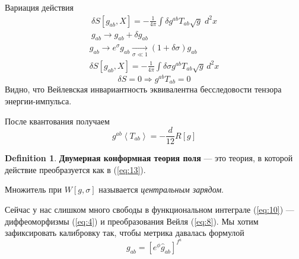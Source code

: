 \documentclass[a4paper,12pt]{article}
\theoremstyle{definition} \newtheorem{Def}{Definition}
\begin{document}
Вариация действия
\begin{equation}
  \label{eq:14}
  \begin{split}
    \delta S[g_{ab},X] = -\frac{1}{4\pi} \int \delta g^{ab} T_{ab} \sqrt{g} \; d^2x\\
    g_{ab}\to g_{ab}+\delta g_{ab}
  \end{split}
\end{equation}
\begin{equation}
  \label{eq:15}
  \begin{split}
    g_{ab} \to e^{\sigma} g_{ab} \xrightarrow[\sigma \ll 1]{} (1+\delta\sigma) g_{ab}\\
    \delta S [g_{ab},X] = -\frac{1}{4\pi} \int \delta\sigma g^{ab} T_{ab} \sqrt{g}\, d^2 x
  \end{split}
\end{equation}
\begin{equation}
  \label{eq:16}
    \delta S =0 \Rightarrow g^{ab}T_{ab}=0
\end{equation}
Видно, что Вейлевская инвариантность эквивалентна бесследовости тензора энергии-импульса.

После квантования получаем 
\begin{equation}
  \label{eq:17}
  g^{ab}\left< T_{ab} \right> = -\frac{d}{12} R[g]
\end{equation}
\begin{Def}
  {\bf Двумерная конформная теория поля} --- это теория, в которой действие преобразуется как в (\ref{eq:13}).

  Множитель при $W[g,\sigma]$ называется {\it центральным зарядом}.
\end{Def}


Сейчас у нас слишком много свободы в функциональном интеграле (\ref{eq:10}) --- диффеоморфизмы (\ref{eq:4})  и преобразования Вейля (\ref{eq:8}). Мы хотим зафиксировать калибровку так, чтобы метрика давалась формулой
\begin{equation}
  \label{eq:20}
  g_{ab}=[e^{\phi} \hat{g}_{ab}]^{f^a}
\end{equation}
\end{document}

